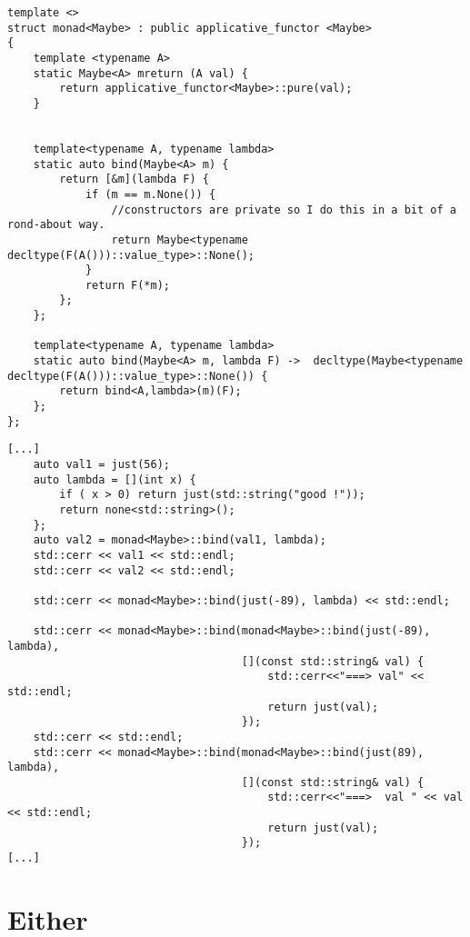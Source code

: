 \documentclass[12pt,fleqn]{article}
\begin{document}
%
%
\begin{minipage}{\linewidth}
\begin{lstlisting}[caption=Maybe monad, label=maybemonad]
template <> 
struct monad<Maybe> : public applicative_functor <Maybe>
{
	template <typename A> 
	static Maybe<A> mreturn (A val) {
		return applicative_functor<Maybe>::pure(val);
	}


	template<typename A, typename lambda>
	static auto bind(Maybe<A> m) {
		return [&m](lambda F) {
			if (m == m.None()) {
				//constructors are private so I do this in a bit of a rond-about way.
				return Maybe<typename decltype(F(A()))::value_type>::None();
			}
			return F(*m);		
		};
	};

	template<typename A, typename lambda>
	static auto bind(Maybe<A> m, lambda F) ->  decltype(Maybe<typename decltype(F(A()))::value_type>::None()) {
		return bind<A,lambda>(m)(F);
	};
};

\end{lstlisting}
\end{minipage}
%
%
%


%
%
\begin{minipage}{\linewidth}
\begin{lstlisting}[caption=Maybe monad example, label=maybemonadexample]
[...]
	auto val1 = just(56);
	auto lambda = [](int x) {
		if ( x > 0) return just(std::string("good !"));
		return none<std::string>();
	};
	auto val2 = monad<Maybe>::bind(val1, lambda);
	std::cerr << val1 << std::endl;
	std::cerr << val2 << std::endl;

	std::cerr << monad<Maybe>::bind(just(-89), lambda) << std::endl;

	std::cerr << monad<Maybe>::bind(monad<Maybe>::bind(just(-89), lambda),
									[](const std::string& val) {
										std::cerr<<"===> val" << std::endl;
										return just(val);
									});
	std::cerr << std::endl;
	std::cerr << monad<Maybe>::bind(monad<Maybe>::bind(just(89), lambda),
									[](const std::string& val) {
										std::cerr<<"===>  val " << val << std::endl;
										return just(val);
									});
[...]
\end{lstlisting}
\end{minipage}
%
%
%


\section{Either}
%
\end{document}

